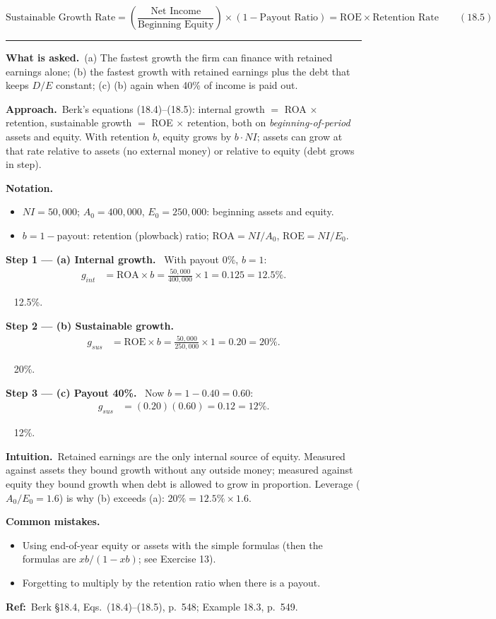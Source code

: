 \documentclass[11pt,a4paper]{article}
\newcommand{\notation}{\par\noindent\textbf{Notation.}}
\newcommand{\step}[2]{\par\medskip\noindent\textbf{Step #1 --- #2.}~}
\newcommand{\intuition}{\par\medskip\noindent\textbf{Intuition.}~}
\newcommand{\refbib}{\par\smallskip\noindent\textbf{Ref:}~}
\newcommand{\asked}{\par\medskip\noindent\textbf{What is asked.}~}
\newcommand{\approach}{\par\smallskip\noindent\textbf{Approach.}~}
\newcommand{\answer}[1]{\par\smallskip\noindent\fbox{\textbf{Answer #1.}}~}
\newcommand{\pitfalls}{\par\medskip\noindent\textbf{Common mistakes.}}
\newcommand{\stmtend}{\par\endgroup\nopagebreak\noindent\rule{\linewidth}{0.4pt}\par\medskip}
\begin{document}
\[\text{Sustainable Growth Rate} = \left(\frac{\text{Net Income}}{\text{Beginning Equity}}\right) \times (1 - \text{Payout Ratio}) = \text{ROE} \times \text{Retention Rate} \qquad (18.5)\]
\stmtend

\asked (a) The fastest growth the firm can finance with retained earnings alone; (b) the fastest growth
with retained earnings plus the debt that keeps $D/E$ constant; (c) (b) again when 40\% of income is
paid out.

\approach Berk's equations (18.4)--(18.5): internal growth $=$ ROA $\times$ retention, sustainable
growth $=$ ROE $\times$ retention, both on \emph{beginning-of-period} assets and equity. With retention
$b$, equity grows by $b\cdot NI$; assets can grow at that rate relative to assets (no external money)
or relative to equity (debt grows in step).

\notation
\begin{itemize}
  \item $NI=50{,}000$; $A_0=400{,}000$, $E_0=250{,}000$: beginning assets and equity.
  \item $b=1-\text{payout}$: retention (plowback) ratio; $\text{ROA}=NI/A_0$, $\text{ROE}=NI/E_0$.
\end{itemize}

\step{1}{(a) Internal growth} With payout 0\%, $b=1$:
\begin{align}
  g_{int} &= \text{ROA}\times b = \frac{50{,}000}{400{,}000}\times 1 = 0.125 = 12.5\%. \label{r2ce4-int}
\end{align}
\answer{(a)} 12.5\%.

\step{2}{(b) Sustainable growth}
\begin{align}
  g_{sus} &= \text{ROE}\times b = \frac{50{,}000}{250{,}000}\times 1 = 0.20 = 20\%. \label{r2ce4-sus}
\end{align}
\answer{(b)} 20\%.

\step{3}{(c) Payout 40\%} Now $b=1-0.40=0.60$:
\begin{align}
  g_{sus} &= (0.20)(0.60) = 0.12 = 12\%. \label{r2ce4-sus40}
\end{align}
\answer{(c)} 12\%.

\intuition Retained earnings are the only internal source of equity. Measured against assets they bound
growth without any outside money; measured against equity they bound growth when debt is allowed to
grow in proportion. Leverage ($A_0/E_0=1.6$) is why (b) exceeds (a): $20\%=12.5\%\times1.6$.
\pitfalls
\begin{itemize}
  \item Using end-of-year equity or assets with the simple formulas (then the formulas are
        $x b/(1-xb)$; see Exercise 13).
  \item Forgetting to multiply by the retention ratio when there is a payout.
\end{itemize}
\refbib{Berk \S18.4, Eqs.~(18.4)--(18.5), p.~548; Example 18.3, p.~549.}
\end{document}

